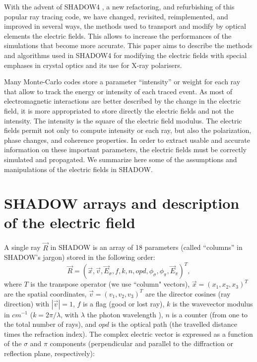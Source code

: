 \documentclass{iucr}
\begin{document}
With the advent of SHADOW4 \cite{ShadowSRN2023}, a new refactoring, and refurbishing of this popular ray tracing code, we have changed, revisited, reimplemented, and improved in several ways, the methods used to transport and modify by optical elements the electric fields. This allows to increase the performances of the simulations that become more accurate.
This paper aims to describe the methods and algorithms used in SHADOW4 for modifying the electric fields with special emphases in crystal optics and its use for X-ray polarisers.   

Many Monte-Carlo codes store a parameter ``intensity'' or weight for each ray that allow to track the energy or intensity of each traced event.
As most of electromagnetic interactions are better described by the change in the electric field, it is more appropriated to store directly the electric fields and not the intensity. 
The intensity is the square of the electric field modulus.
The electric fields permit not only to compute intensity or each ray, but also the polarization, phase changes, and coherence properties.
In order to extract usable and accurate information on these important parameters, the electric fields must be correctly simulated and propagated.
We summarize here some of the assumptions and manipulations of the electric fields in SHADOW. 



\section{SHADOW arrays and description of the electric field}\label{sec:definitions}

A single ray $\vec{R}$ in SHADOW is an array of 18 parameters (called ``columns'' in SHADOW's jargon) stored in the following order:
\begin{equation}
   \vec{R}=( \vec{x},\vec{v},\vec{E}_\sigma,f,k,n,opd,\phi_\sigma,\phi_\pi,\vec{E}_\pi)^T,
\end{equation}
where $T$ is the transpose operator (we use ``column" vectors), $\vec{x}=(x_1,x_2,x_3)^T$ are the spatial coordinates, $\vec{v}=(v_1,v_2,v_3)^T$ are the director cosines (ray direction) with $|\vec{v}|=1$, $f$ is a flag (good or lost ray), $k$ is the wavevector modulus in $cm^{-1}$ ($k=2\pi / \lambda$, with $\lambda$ the photon wavelength ), $n$ is a counter (from one to the total number of rays), and $opd$ is the optical path (the travelled distance times the refraction index).
The complex electric vector is expressed as a function of the $\sigma$ and $\pi$ components (perpendicular and parallel to the diffraction or reflection plane, respectively):
\end{document}
